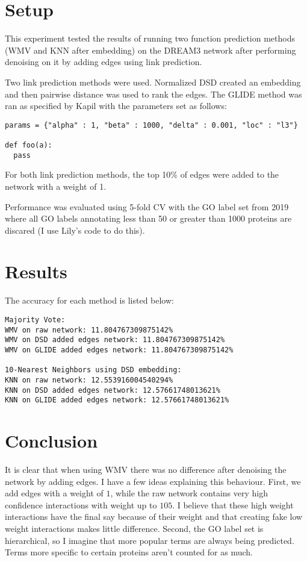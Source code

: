 \documentclass[11pt]{article}
\author{Henri Schmidt}
\date{\today}
\title{}
\begin{document}
\tableofcontents


\section{Setup}
\label{sec:org5e38917}
This experiment tested the results of running two function prediction
methods (WMV and KNN after embedding) on the DREAM3 network after
performing denoising on it by adding edges using link prediction.

Two link prediction methods were used. Normalized DSD created an
embedding and then pairwise distance was used to rank the edges. The
GLIDE method was ran as specified by Kapil with the parameters 
set as follows:

\begin{verbatim}
params = {"alpha" : 1, "beta" : 1000, "delta" : 0.001, "loc" : "l3"}

def foo(a):
  pass
\end{verbatim}

For both link prediction methods, the top 10\% of edges were added to
the network with a weight of 1.

Performance was evaluated using 5-fold CV with the GO label set from
2019 where all GO labels annotating less than 50 or greater than 1000
proteins are discared (I use Lily's code to do this).

\section{Results}
\label{sec:org2ca20e5}
The accuracy for each method is listed below:

\begin{verbatim}
Majority Vote: 
WMV on raw network: 11.804767309875142%
WMV on DSD added edges network: 11.804767309875142%
WMV on GLIDE added edges network: 11.804767309875142%

10-Nearest Neighbors using DSD embedding:
KNN on raw network: 12.553916004540294%
KNN on DSD added edges network: 12.57661748013621%
KNN on GLIDE added edges network: 12.57661748013621%
\end{verbatim}

\section{Conclusion}
\label{sec:org18ebe93}
It is clear that when using WMV there was no difference after
denoising the network by adding edges. I have a few ideas explaining
this behaviour. First, we add edges with a weight of \(1\), while the
raw network contains very high confidence interactions with weight up
to \(105\). I believe that these high weight interactions have the final
say because of their weight and that creating fake low weight
interactions makes little difference. Second, the GO label set is
hierarchical, so I imagine that more popular terms are always being
predicted. Terms more specific to certain proteins aren't counted for
as much.
\end{document}
